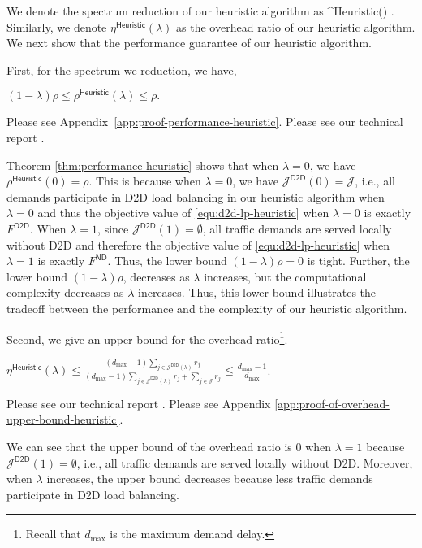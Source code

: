 We denote the spectrum reduction of our heuristic algorithm as
\be
\rho^{\textsf{Heuristic}}(\lambda) \triangleq {}.
\ee
Similarly, we denote $\eta^{\textsf{Heuristic}}(\lambda)$ as the overhead ratio of our heuristic algorithm.
We next show that the performance guarantee of our heuristic algorithm.

First, for the spectrum we reduction, we have,
\begin{theorem} \label{thm:performance-heuristic}
$(1-\lambda) \rho \le \rho^{\textsf{Heuristic}}(\lambda) \le \rho.$
\end{theorem}
\begin{IEEEproof}
\ifx \ISTR \undefined
Please see Appendix~\ref{app:proof-performance-heuristic}.
\else
Please see our technical report \cite{TR}.
\fi
\end{IEEEproof}





Theorem \ref{thm:performance-heuristic} shows that when $\lambda=0$, we have
$\rho^{\textsf{Heuristic}}(0) = \rho$. This is because when $\lambda=0$, we have
$\mathcal{J}^{\textsf{D2D}}(0)=\mathcal{J}$, i.e., all demands  participate
in D2D load balancing in our heuristic algorithm when $\lambda=0$ and thus
the objective value of \eqref{equ:d2d-lp-heuristic} when $\lambda=0$ is exactly $F^\textsf{D2D}$.
When $\lambda=1$, since $\mathcal{J}^{\textsf{D2D}}(1)=\emptyset$, all traffic demands are served locally without D2D and
therefore the objective value of \eqref{equ:d2d-lp-heuristic} when $\lambda=1$ is exactly $F^\textsf{ND}$.
Thus, the lower bound $(1-\lambda) \rho = 0$  is tight.
Further, the lower bound $(1-\lambda) \rho$,
decreases as $\lambda$ increases, but the computational complexity
decreases as $\lambda$ increases. Thus, this lower bound illustrates
the tradeoff between the performance and the complexity of our heuristic algorithm.

Second, we give an upper bound for the overhead ratio\footnote{Recall that $d_{\max}$ is the maximum demand delay.}.
\begin{theorem} \label{the:overhead-upper-bound-heuristic}
$\eta^{\textsf{Heuristic}}(\lambda) \le \frac{ (d_{\max}-1) \sum\limits_{j \in \mathcal{J}^{\textsf{D2D}  }(\lambda)} r_j }{
(d_{\max}-1) \sum\limits_{j \in \mathcal{J}^{\textsf{D2D}  }(\lambda)} r_j + \sum\limits_{j \in \mathcal{J}} r_j} \le \frac{d_{\max}-1}{d_{\max}}$.
\end{theorem}
\begin{IEEEproof}
\ifx \ISTR \undefined
Please see our technical report \cite{TR}.
\else
Please see Appendix \ref{app:proof-of-overhead-upper-bound-heuristic}.
\fi
\end{IEEEproof}
We can see that the upper bound of the overhead ratio is 0 when $\lambda=1$ because $\mathcal{J}^{\textsf{D2D}}(1)=\emptyset$, i.e.,
all traffic demands are served locally without D2D. Moreover, when $\lambda$ increases, the upper bound decreases because
less traffic demands participate in D2D load balancing.

